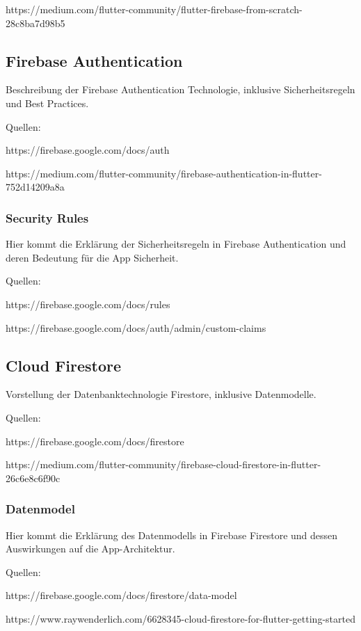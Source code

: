 https://medium.com/flutter-community/flutter-firebase-from-scratch-28c8ba7d98b5

\subsection{Firebase Authentication}

Beschreibung der Firebase Authentication Technologie, inklusive Sicherheitsregeln und Best Practices.

Quellen: 

https://firebase.google.com/docs/auth 

https://medium.com/flutter-community/firebase-authentication-in-flutter-752d14209a8a

\subsubsection{Security Rules}

Hier kommt die Erklärung der Sicherheitsregeln in Firebase Authentication und deren Bedeutung für die App Sicherheit.

Quellen: 

https://firebase.google.com/docs/rules 

https://firebase.google.com/docs/auth/admin/custom-claims

\subsection{Cloud Firestore}

Vorstellung der Datenbanktechnologie Firestore, inklusive Datenmodelle.

Quellen: 

https://firebase.google.com/docs/firestore

https://medium.com/flutter-community/firebase-cloud-firestore-in-flutter-26c6e8c6f90c

\subsubsection{Datenmodel}

Hier kommt die Erklärung des Datenmodells in Firebase Firestore und dessen Auswirkungen auf die App-Architektur.

Quellen: 

https://firebase.google.com/docs/firestore/data-model

https://www.raywenderlich.com/6628345-cloud-firestore-for-flutter-getting-started

